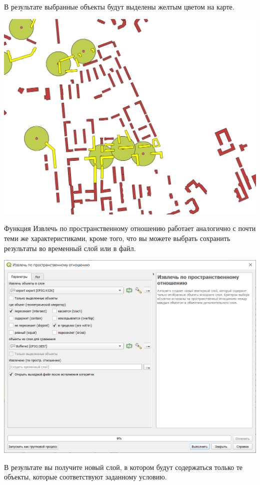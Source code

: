 \documentclass[
]{book}
\begin{document}
В результате выбранные объекты будут выделены желтым цветом на карте.

\includegraphics{figures/50.png}

Функция Извлечь по пространственному отношению работает аналогично с почти теми же характеристиками, кроме того, что вы можете выбрать сохранить результаты во временный слой или в файл.

\includegraphics{figures/51.png}

В результате вы получите новый слой, в котором будут содержаться только те объекты, которые соответствуют заданному условию.
\end{document}
